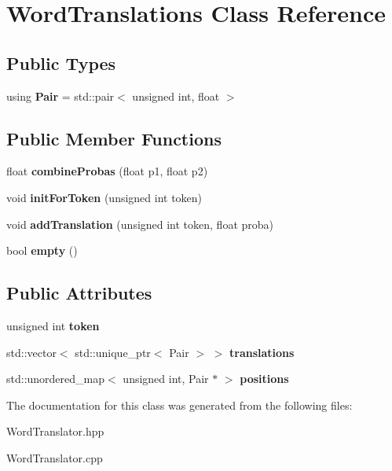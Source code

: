 \hypertarget{classWordTranslations}{}\section{Word\+Translations Class Reference}
\label{classWordTranslations}
\subsection*{Public Types}
\begin{DoxyCompactItemize}
\item 
\mbox{\label{classWordTranslations_af5fb38888c5aebb46245a69dc09da445}} 
using {\bfseries Pair} = std\+::pair$<$ unsigned int, float $>$
\end{DoxyCompactItemize}
\subsection*{Public Member Functions}
\begin{DoxyCompactItemize}
\item 
\mbox{\label{classWordTranslations_ac0f45e5c4155787ca85297cd82df3c6c}} 
float {\bfseries combine\+Probas} (float p1, float p2)
\item 
\mbox{\label{classWordTranslations_aac43127bc3f117331995c214f94ac92f}} 
void {\bfseries init\+For\+Token} (unsigned int token)
\item 
\mbox{\label{classWordTranslations_aaf8af6a16f9831e622c23eca84608e0f}} 
void {\bfseries add\+Translation} (unsigned int token, float proba)
\item 
\mbox{\label{classWordTranslations_a5e4f3e0e4c51b4aac6a60a3dd16001f7}} 
bool {\bfseries empty} ()
\end{DoxyCompactItemize}
\subsection*{Public Attributes}
\begin{DoxyCompactItemize}
\item 
\mbox{\label{classWordTranslations_aa5ab1c43ddab547d46bd4d1e5cb3bfc1}} 
unsigned int {\bfseries token}
\item 
\mbox{\label{classWordTranslations_ab1104aea3c7de7c4e16b529cc6bd371e}} 
std\+::vector$<$ std\+::unique\+\_\+ptr$<$ Pair $>$ $>$ {\bfseries translations}
\item 
\mbox{\label{classWordTranslations_a825d6d8ded379c5b19b3fd53d2a2faaa}} 
std\+::unordered\+\_\+map$<$ unsigned int, Pair $\ast$ $>$ {\bfseries positions}
\end{DoxyCompactItemize}


The documentation for this class was generated from the following files\+:\begin{DoxyCompactItemize}
\item 
Word\+Translator.\+hpp\item 
Word\+Translator.\+cpp\end{DoxyCompactItemize}
